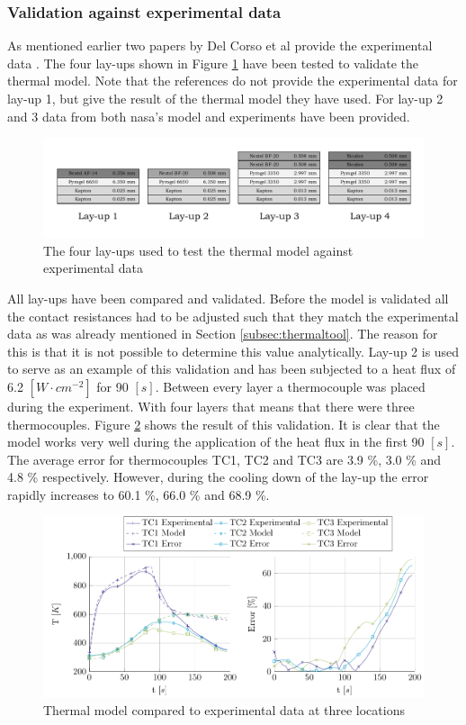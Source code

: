 \subsubsection{Validation against experimental data}
As mentioned earlier two papers by Del Corso et al provide the experimental data \cite{Corso2009,Corso2011}. The four lay-ups shown in Figure \ref{fig:vallayup} have been tested to validate the thermal model. Note that the references do not provide the experimental data for lay-up 1, but give the result of the thermal model they have used. For lay-up 2 and 3 data from both \gls{nasa}'s model and experiments have been provided. 


\begin{figure}[h]
	\centering
	\includegraphics[width=\textwidth]{Figure/Thermal/vallayup.pdf}
	\caption{The four lay-ups used to test the thermal model against experimental data}
	\label{fig:vallayup}
\end{figure}

All lay-ups have been compared and validated. Before the model is validated all the contact resistances had to be adjusted such that they match the experimental data as was already mentioned in Section \ref{subsec:thermaltool}. The reason for this is that it is not possible to determine this value analytically. Lay-up 2 is used to serve as an example of this validation and has been subjected to a heat flux of 6.2 $\left[W\cdot cm^{-2}\right]$ for 90 $\left[s\right]$. Between every layer a thermocouple was placed during the experiment. With four layers that means that there were three thermocouples. Figure \ref{fig:plotvallay2} shows the result of this validation. It is clear that the model works very well during the application of the heat flux in the first 90 $\left[s\right]$. The average error for thermocouples TC1, TC2 and TC3 are 3.9 \%, 3.0 \% and 4.8 \% respectively. However, during the cooling down of the lay-up the error rapidly increases to 60.1 \%, 66.0 \% and 68.9 \%.

\begin{figure}[H]
	\centering
	\includegraphics{Figure/Thermal/plotvallay2.pdf}
	\caption{Thermal model compared to experimental data at three locations}
	\label{fig:plotvallay2}
\end{figure}

